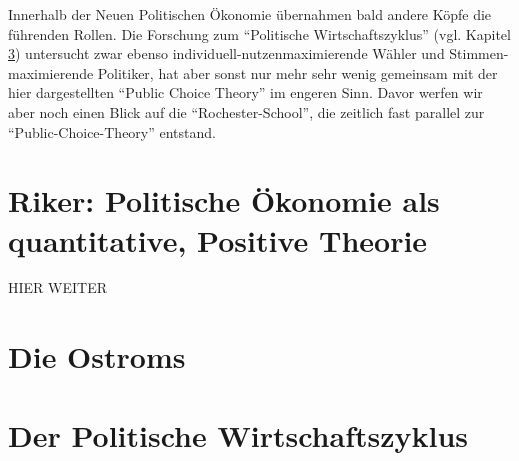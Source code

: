 Innerhalb der Neuen Politischen Ökonomie übernahmen bald andere Köpfe die führenden Rollen. Die Forschung zum "`Politische Wirtschaftszyklus"' (vgl. Kapitel \ref{Der Politische Wirtschaftszyklus}) untersucht zwar ebenso individuell-nutzenmaximierende Wähler und Stimmen-maximierende Politiker, hat aber sonst nur mehr sehr wenig gemeinsam mit der hier dargestellten "`Public Choice Theory"' im engeren Sinn. Davor werfen wir aber noch einen Blick auf die "`Rochester-School"', die zeitlich fast parallel zur "`Public-Choice-Theory"' entstand.


\section{Riker: Politische Ökonomie als quantitative, Positive Theorie}

HIER WEITER
\textcite[S. 176]{Romer1988}
\textcite[S. 102]{Mitchell1988}


\section{Die Ostroms}

\textcite[S. 110]{Mitchell1988}



\section{Der Politische Wirtschaftszyklus}
\label{Der Politische Wirtschaftszyklus}

